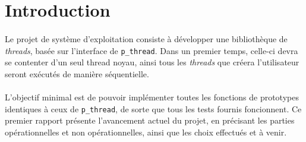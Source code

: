 \documentclass[a4paper]{article}
\begin{document}


\newpage


\section*{Introduction}

\paragraph{}
Le projet de système d'exploitation consiste à développer une bibliothèque de \emph{threads}, basée sur l'interface de \texttt{p\_thread}. Dans un premier temps, celle-ci devra se contenter d'un seul thread noyau, ainsi tous les \emph{threads} que créera l'utilisateur seront exécutés de manière séquentielle. 

\paragraph{}
L'objectif minimal est de pouvoir implémenter toutes les fonctions de prototypes identiques à ceux de \texttt{p\_thread}, de sorte que tous les tests fournis foncionnent. Ce premier rapport présente l'avancement actuel du projet, en précisant les parties opérationnelles et non opérationnelles, ainsi que les choix effectués et à venir.




\end{document}
